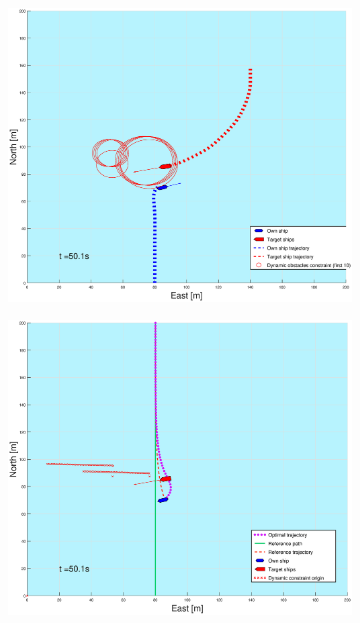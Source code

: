 \begin{figure}[ht!]
\begin{subfigure}[b]{0.499\textwidth}
    \end{subfigure}
    \hfill
    \\
    \begin{subfigure}[b]{0.49\textwidth}
        \centering
        \includegraphics[width=\textwidth]{Images/Figures/sving_GW/_Simple_0fig1_time=50}
    \end{subfigure}
    \hfill
    \begin{subfigure}[b]{0.499\textwidth}
        \centering
        \includegraphics[width=\textwidth]{Images/Figures/sving_GW/_Simple_0fig999_time=50}

\end{subfigure}
\end{figure}
